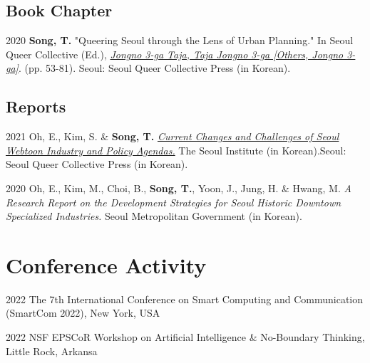 \documentclass[12pt,letterpaper]{report}
\begin{document}
    \subsection*{Book Chapter}
    \begin{tablist}
        \item[2020] \tab{}\textbf{Song, T.} "Queering Seoul through the Lens of Urban Planning." In Seoul Queer Collective (Ed.), \emph{\href{http://www.kyobobook.co.kr/product/detailViewKor.laf?ejkGb=KOR&mallGb=KOR&barcode=9791197096501}{Jongno 3-ga Taja, Taja Jongno 3-ga [Others, Jongno 3-ga]}}. (pp. 53-81). Seoul: Seoul Queer Collective Press (in Korean).
    \end{tablist}
    \subsection*{Reports}
    \begin{tablist}
        \item[2021] Oh, E., Kim, S. \& \textbf{Song, T.} \emph{\href{http://global.si.re.kr/content/current-changes-and-challenges-seoul-webtoon-industry-and-policy-agendas}{Current Changes and Challenges of Seoul Webtoon Industry and Policy Agendas.}} The Seoul Institute (in Korean).Seoul: Seoul Queer Collective Press (in Korean).
        \item[2020] Oh, E., Kim, M., Choi, B., \textbf{Song, T.}, Yoon, J., Jung, H. \& Hwang, M. \emph{A Research Report on the Development Strategies for Seoul Historic Downtown Specialized Industries.} Seoul Metropolitan Government (in Korean).
    \end{tablist}


    \section*{Conference Activity}
    \begin{tablist}
        \item[2022] \tab{}The 7th International Conference on Smart Computing and Communication (SmartCom 2022), New York, USA
        \item[2022] \tab{}NSF EPSCoR Workshop on Artificial Intelligence \& No-Boundary Thinking, Little Rock, Arkansa
    \end{tablist}
\end{document}
